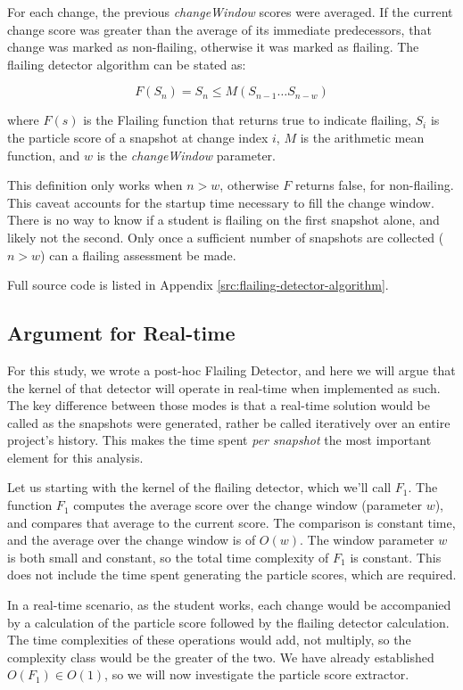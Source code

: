 For each change, the previous \emph{changeWindow} scores were averaged. If the current change score was greater than the average of its immediate predecessors, that change was marked as non-flailing, otherwise it was marked as flailing. The flailing detector algorithm can be stated as: 

\[F(S_n) = S_n \leq M(S_{n-1} \dots S_{n-w})\]

\noindent where $F(s)$ is the Flailing function that returns true to indicate flailing, $S_i$ is the particle score of a snapshot at change index $i$, $M$ is the arithmetic mean function, and $w$ is the \emph{changeWindow} parameter. 

This definition only works when $n > w$, otherwise $F$ returns false, for non-flailing. This caveat accounts for the startup time necessary to fill the change window. There is no way to know if a student is flailing on the first snapshot alone, and likely not the second. Only once a sufficient number of snapshots are collected ($n>w$) can a flailing assessment be made.

Full source code is listed in Appendix \ref{src:flailing-detector-algorithm}.

\subsection{Argument for Real-time}
For this study, we wrote a post-hoc Flailing Detector, and here we will argue that the kernel of that detector will operate in real-time when implemented as such. The key difference between those modes is that a real-time solution would be called as the snapshots were generated, rather be called iteratively over an entire project's history. This makes the time spent \emph{per snapshot} the most important element for this analysis.

Let us starting with the kernel of the flailing detector, which we'll call $F_1$. The function $F_1$ computes the average score over the change window (parameter $w$), and compares that average to the current score. The comparison is constant time, and the average over the change window is of $O(w)$. The window parameter $w$ is both small and constant, so the total time complexity of $F_1$ is constant. This does not include the time spent generating the particle scores, which are required.

In a real-time scenario, as the student works, each change would be accompanied by a calculation of the particle score followed by the flailing detector calculation. The time complexities of these operations would add, not multiply, so the complexity class would be the greater of the two. We have already established $O(F_1) \in O(1)$, so we will now investigate the particle score extractor.

